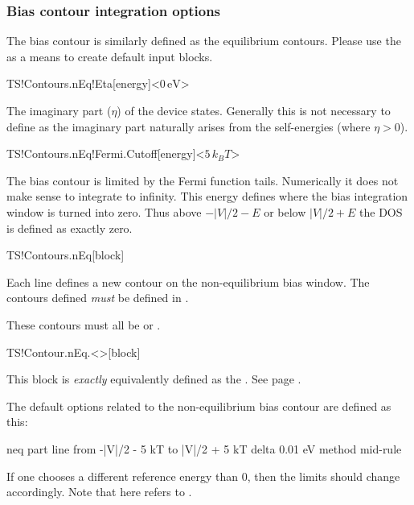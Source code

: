 \subsubsection{Bias contour integration options}

The bias contour is similarly defined as the equilibrium
contours. Please use the  as a means to
create default input blocks.

\begin{fdfentry}{TS!Contours.nEq!Eta}[energy]<$0\,\mathrm{eV}$>

  The imaginary part ($\eta$) of the device states. Generally this is
  not necessary to define as the imaginary part naturally arises from
  the self-energies (where $\eta>0$).

\end{fdfentry}

\begin{fdfentry}{TS!Contours.nEq!Fermi.Cutoff}[energy]<$5\,k_BT$>

  The bias contour is limited by the Fermi function tails. Numerically
  it does not make sense to integrate to infinity.
  This energy defines where the bias integration window is turned into
  zero. Thus above $-|V|/2-E$ or below $|V|/2+E$ the DOS is defined as
  exactly zero.

\end{fdfentry}

\begin{fdfentry}{TS!Contours.nEq}[block]

  Each line defines a new contour on the non-equilibrium bias
  window. The contours defined \emph{must} be defined in
  . 

  These contours must all be  or . 
  
\end{fdfentry}

\begin{fdfentry}{TS!Contour.nEq.<>}[block]

  This block is \emph{exactly} equivalently defined as the
  . See page \pageref{TS!Contour.<>}.
  
\end{fdfentry}

The default options related to the non-equilibrium bias contour are
defined as this:
\begin{fdfexample}
    neq
    part line
     from -|V|/2 - 5 kT to |V|/2 + 5 kT
       delta 0.01 eV
        method mid-rule
\end{fdfexample}
If one chooses a different reference energy than $0$, then the limits
should change accordingly. Note that here  refers to
.


